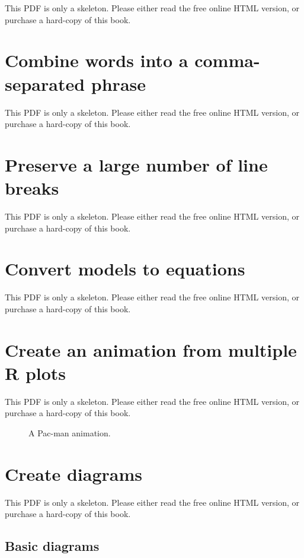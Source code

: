\documentclass[
  11pt,
]{krantz}
\begin{document}
This PDF is only a skeleton. Please either read the free online HTML version, or purchase a hard-copy of this book.

\section{Combine words into a comma-separated phrase}\label{combine-words}

This PDF is only a skeleton. Please either read the free online HTML version, or purchase a hard-copy of this book.

\section{Preserve a large number of line breaks}\label{linebreaks}

This PDF is only a skeleton. Please either read the free online HTML version, or purchase a hard-copy of this book.

\section{Convert models to equations}\label{equatiomatic}

This PDF is only a skeleton. Please either read the free online HTML version, or purchase a hard-copy of this book.

\section{Create an animation from multiple R plots}\label{animation}

This PDF is only a skeleton. Please either read the free online HTML version, or purchase a hard-copy of this book.

\begin{figure}\caption{A Pac-man animation.}\end{figure}

\section{Create diagrams}\label{diagrams}

This PDF is only a skeleton. Please either read the free online HTML version, or purchase a hard-copy of this book.

\subsection{Basic diagrams}\label{basic-diagrams}
\end{document}
